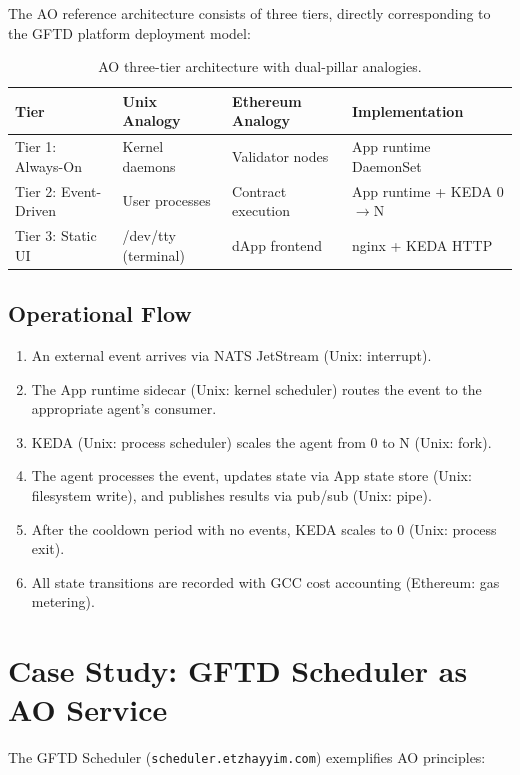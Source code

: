 \documentclass[11pt,a4paper]{article}
\begin{document}
The AO reference architecture consists of three tiers, directly
corresponding to the GFTD platform deployment model:

\begin{table}[h]
\centering
\begin{tabular}{@{}llll@{}}
\toprule
\textbf{Tier} & \textbf{Unix Analogy} & \textbf{Ethereum Analogy} & \textbf{Implementation} \\
\midrule
Tier 1: Always-On & Kernel daemons & Validator nodes & App runtime DaemonSet \\
Tier 2: Event-Driven & User processes & Contract execution & App runtime + KEDA 0$\rightarrow$N \\
Tier 3: Static UI & /dev/tty (terminal) & dApp frontend & nginx + KEDA HTTP \\
\bottomrule
\end{tabular}
\caption{AO three-tier architecture with dual-pillar analogies.}
\end{table}

\subsection{Operational Flow}

\begin{enumerate}[nosep]
  \item An external event arrives via NATS JetStream (Unix: interrupt).
  \item The App runtime sidecar (Unix: kernel scheduler) routes the event to
    the appropriate agent's consumer.
  \item KEDA (Unix: process scheduler) scales the agent from 0 to N
    (Unix: fork).
  \item The agent processes the event, updates state via App state store
    (Unix: filesystem write), and publishes results via pub/sub
    (Unix: pipe).
  \item After the cooldown period with no events, KEDA scales to 0
    (Unix: process exit).
  \item All state transitions are recorded with GCC cost accounting
    (Ethereum: gas metering).
\end{enumerate}

\section{Case Study: GFTD Scheduler as AO Service}

The GFTD Scheduler (\texttt{scheduler.etzhayyim.com}) exemplifies AO principles:
\end{document}
